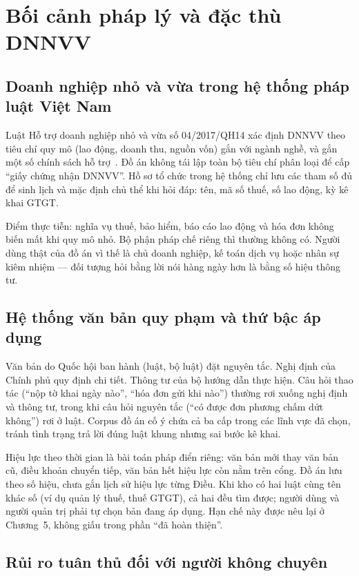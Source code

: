 \section{Bối cảnh pháp lý và đặc thù DNNVV}

\subsection{Doanh nghiệp nhỏ và vừa trong hệ thống pháp luật Việt Nam}

Luật Hỗ trợ doanh nghiệp nhỏ và vừa số 04/2017/QH14 xác định DNNVV theo tiêu
chí quy mô (lao động, doanh thu, nguồn vốn) gắn với ngành nghề, và gắn một số
chính sách hỗ trợ~\cite{quochoi2017}. Đồ án không tái lập toàn bộ tiêu chí phân
loại để cấp ``giấy chứng nhận DNNVV''. Hồ sơ tổ chức trong hệ thống chỉ lưu các
tham số đủ để sinh lịch và mặc định chủ thể khi hỏi đáp: tên, mã số thuế, số
lao động, kỳ kê khai GTGT.

Điểm thực tiễn: nghĩa vụ thuế, bảo hiểm, báo cáo lao động và hóa đơn không biến
mất khi quy mô nhỏ. Bộ phận pháp chế riêng thì thường không có. Người dùng thật
của đồ án vì thế là chủ doanh nghiệp, kế toán dịch vụ hoặc nhân sự kiêm nhiệm
--- đối tượng hỏi bằng lời nói hàng ngày hơn là bằng số hiệu thông tư.

\subsection{Hệ thống văn bản quy phạm và thứ bậc áp dụng}

Văn bản do Quốc hội ban hành (luật, bộ luật) đặt nguyên tắc. Nghị định của
Chính phủ quy định chi tiết. Thông tư của bộ hướng dẫn thực hiện. Câu hỏi thao
tác (``nộp tờ khai ngày nào'', ``hóa đơn gửi khi nào'') thường rơi xuống nghị
định và thông tư, trong khi câu hỏi nguyên tắc (``có được đơn phương chấm dứt
không'') rơi ở luật. Corpus đồ án cố ý chứa cả ba cấp trong các lĩnh vực đã chọn,
tránh tình trạng trả lời đúng luật khung nhưng sai bước kê khai.

Hiệu lực theo thời gian là bài toán pháp điển riêng: văn bản mới thay văn bản
cũ, điều khoản chuyển tiếp, văn bản hết hiệu lực còn nằm trên cổng. Đồ án lưu
theo số hiệu, chưa gắn lịch sử hiệu lực từng Điều. Khi kho có hai luật cùng tên
khác số (ví dụ quản lý thuế, thuế GTGT), cả hai đều tìm được; người dùng và
người quản trị phải tự chọn bản đang áp dụng. Hạn chế này được nêu lại ở
Chương~5, không giấu trong phần ``đã hoàn thiện''.

\subsection{Rủi ro tuân thủ đối với người không chuyên}


